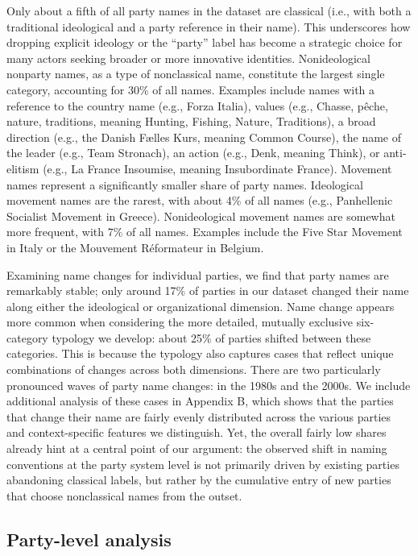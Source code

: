 \documentclass[12pt]{article}
\begin{document}
Only about a fifth of all party names in the dataset are classical (i.e., with both a traditional ideological and a party reference in their name). This underscores how dropping explicit ideology or the “party” label has become a strategic choice for many actors seeking broader or more innovative identities. Nonideological nonparty names, as a type of nonclassical name, constitute the largest single category, accounting for 30\% of all names. Examples include names with a reference to the country name (e.g., Forza Italia), values (e.g., Chasse, pêche, nature, traditions, meaning Hunting, Fishing, Nature, Traditions), a broad direction (e.g., the Danish Fælles Kurs, meaning Common Course), the name of the leader (e.g., Team Stronach), an action (e.g., Denk, meaning Think), or anti-elitism (e.g., La France Insoumise, meaning Insubordinate France). Movement names represent a significantly smaller share of party names. Ideological movement names are the rarest, with about 4\% of all names (e.g., Panhellenic Socialist Movement in Greece). Nonideological movement names are somewhat more frequent, with 7\% of all names. Examples include the Five Star Movement in Italy or the Mouvement Réformateur in Belgium.

Examining name changes for individual parties, we find that party names are remarkably stable; only around 17\% of parties in our dataset changed their name along either the ideological or organizational dimension. Name change appears more common when considering the more detailed, mutually exclusive six-category typology we develop: about 25\% of parties shifted between these categories. This is because the typology also captures cases that reflect unique combinations of changes across both dimensions. There are two particularly pronounced waves of party name changes: in the 1980s and the 2000s. We include additional analysis of these cases in Appendix B, which shows that the parties that change their name are fairly evenly distributed across the various parties and context-specific features we distinguish. Yet, the overall fairly low shares already hint at a central point of our argument: the observed shift in naming conventions at the party system level is not primarily driven by existing parties abandoning classical labels, but rather by the cumulative entry of new parties that choose nonclassical names from the outset.

\subsection{Party-level analysis}
\end{document}
